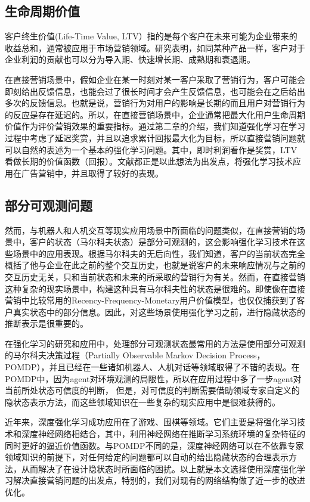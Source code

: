\subsection{生命周期价值}
客户终生价值(Life-Time Value, LTV）指的是每个客户在未来可能为企业带来的收益总和，通常被应用于市场营销领域。研究表明，如同某种产品一样，客户对于企业利润的贡献也可以分为导入期、快速增长期、成熟期和衰退期。

在直接营销场景中，假如企业在某一时刻对某一客户采取了营销行为，客户可能会即刻给出反馈信息，也能会过了很长时间才会产生反馈信息，也可能会在之后给出多次的反馈信息。也就是说，营销行为对用户的影响是长期的而且用户对营销行为的反应是存在延迟的。所以，在直接营销场景中，企业通常把最大化用户生命周期价值作为评价营销效果的重要指标。通过第二章的介绍，我们知道强化学习在学习过程中考虑了延迟奖赏，并且以追求累计回报最大化为目标，所以直接营销问题就可以自然的表述为一个基本的强化学习问题。其中，即时利润看作是奖赏，LTV看做长期的价值函数（回报）。文献\citep{tkachenko2015autonomous,pednault2002sequential,silver2013concurrent}都正是以此想法为出发点，将强化学习技术应用在广告营销中，并且取得了较好的表现。

\subsection{部分可观测问题}
然而，与机器人和人机交互等现实应用场景中所面临的问题类似，在直接营销的场景中，客户的状态（马尔科夫状态）是部分可观测的，这会影响强化学习技术在这些场景中的应用表现。根据马尔科夫的无后向性，我们知道，客户的当前状态完全概括了他与企业在此之前的整个交互历史，也就是说客户的未来响应情况与之前的交互历史无关，只和当前状态和未来的所采取的营销行为有关。然而，在直接营销这种复杂的现实场景中，构建这种具有马尔科夫性的状态是很难的。即使像在直接营销中比较常用的Recency-Frequency-Monetary用户价值模型\citep{tkachenko2015autonomous}，也仅仅捕获到了客户真实状态中的部分信息。因此，对这些场景使用强化学习之前，进行隐藏状态的推断表示是很重要的。

在强化学习的研究和应用中，处理部分可观测状态最常用的方法是使用部分可观测的马尔科夫决策过程（Partially Observable Markov  Decision Process，POMDP）\citep{kaelbling1998planning}，并且已经在一些诸如机器人、人机对话等领域取得了不错的表现\citep{pineau2003point,williams2007partially}。在POMDP中，因为agent对环境观测的局限性，所以在应用过程中多了一步agent对当前所处状态可信度的判断，
但是，对可信度的判断需要借助领域专家自定义的隐状态表示方法，而这些领域知识在一些复杂的现实应用中是很难获得的。

近年来，深度强化学习成功应用在了游戏、围棋等领域。它们主要是将强化学习技术和深度神经网络相结合，其中，利用神经网络在推断学习系统环境的复杂特征的同时更好的逼近价值函数。与POMDP不同的是，深度神经网络可以在不依靠专家领域知识的前提下，对任何给定的问题都可以自动的给出隐藏状态的合理表示方法\citep{deng2014deep}，从而解决了在设计隐状态时所面临的困扰。以上就是本文选择使用深度强化学习解决直接营销问题的出发点，特别的，我们对现有的网络结构做了近一步的改进优化。

